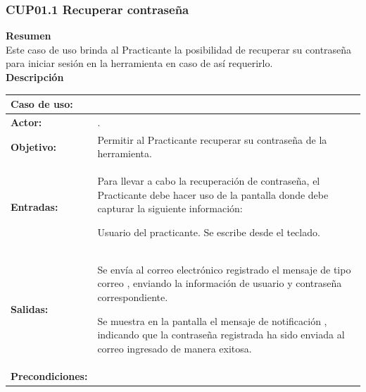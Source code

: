 \subsubsection{CUP01.1 Recuperar contraseña}
\label{cu:CUP01.1}

\textbf{\textcolor[rgb]{0, 0, 0.545098}{Resumen}} \\

Este caso de uso brinda al Practicante la posibilidad de recuperar su contraseña para iniciar sesión en la herramienta en caso de así requerirlo. \\

\textbf{\textcolor[rgb]{0, 0, 0.545098}{Descripción}}

\begin{table}[H]
\centering
\begin{tabular}{| l | p{12 cm} |}
\hline
\rowcolor[rgb]{0.529412, 0.807843, 0.980392} {\textbf{Caso de uso:}} & \hspace{7em}{\textbf{CUP01.1 Recuperar contraseña}}\\
\hline
\textbf{Actor:} &  \nameref{act:Practicante}. \\
\hline
\textbf{Objetivo:} & Permitir al Practicante recuperar su contraseña de la herramienta. \\
\hline
\textbf{Entradas:} & Para llevar a cabo la recuperación de contraseña, el Practicante debe hacer uso de la pantalla \nameref{pant:IUP01.1} donde debe capturar la siguiente información:
		\begin{compactitem} 
			\setlength\itemsep{-0.25em}
			\item Usuario del practicante. Se escribe desde el teclado.
		\end{compactitem} \\
\hline
\textbf{Salidas:} &	\vspace{-2mm}	%
					\begin{compactitem}
						\setlength\itemsep{-0.25em}
						\item Se envía al correo electrónico registrado el mensaje de tipo correo \nameref{msj:MSG08}, enviando la información de usuario y contraseña correspondiente.
						\item Se muestra en la pantalla \nameref{pant:IUP01.1} el mensaje de notificación \nameref{msj:MSG03}, indicando que la contraseña registrada ha sido enviada al correo ingresado de manera exitosa.
					\end{compactitem}\\
\hline
\textbf{Precondiciones:} & 	\vspace{-2mm}	%

\end{tabular}
\end{table}
